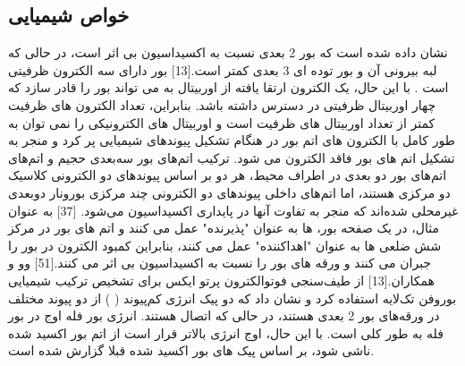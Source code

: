 \subsection{خواص شیمیایی}
نشان داده شده است که بور 2 بعدی نسبت به اکسیداسیون بی اثر است، در حالی که لبه بیرونی آن و بور توده ای 3 بعدی کمتر است.[13] بور دارای سه الکترون ظرفیتی است . با این حال، یک الکترون ارتقا یافته از اوربیتال  به  می تواند بور را قادر سازد که چهار اوربیتال ظرفیتی در دسترس داشته باشد. بنابراین، تعداد الکترون های ظرفیت کمتر از تعداد اوربیتال های ظرفیت است و اوربیتال های الکترونیکی را نمی توان به طور کامل با الکترون های اتم بور در هنگام تشکیل پیوندهای شیمیایی پر کرد و منجر به تشکیل اتم های بور فاقد الکترون می شود. ترکیب اتم‌های بور سه‌بعدی حجیم و اتم‌های اتم‌های بور دو بعدی در اطراف محیط، هر دو بر اساس پیوندهای دو الکترونی کلاسیک دو مرکزی هستند، اما اتم‌های داخلی پیوندهای دو الکترونی چند مرکزی بورونار دوبعدی غیرمحلی شده‌اند که منجر به تفاوت آنها در پایداری اکسیداسیون می‌شود. [37] به عنوان مثال، در یک صفحه بور،  ها به عنوان "پذیرنده" عمل می کنند و اتم های بور در مرکز شش ضلعی ها به عنوان "اهداکننده" عمل می کنند، بنابراین کمبود الکترون در بور را جبران می کنند و ورقه های بور را نسبت به اکسیداسیون بی اثر می کنند.[51] وو و همکاران.[13] از طیف‌سنجی فوتوالکترون پرتو ایکس  برای تشخیص ترکیب شیمیایی بوروفن تک‌لایه استفاده کرد و نشان داد که دو پیک انرژی کم‌پیوند ( ) از دو پیوند  مختلف در ورقه‌های بور 2 بعدی هستند، در حالی که اتصال هستند. انرژی بور فله  اوج در بور فله  به طور کلی  است. با این حال، اوج انرژی بالاتر  قرار است از اتم بور اکسید شده ناشی شود، بر اساس پیک های بور اکسید شده قبلا گزارش شده است.
  
